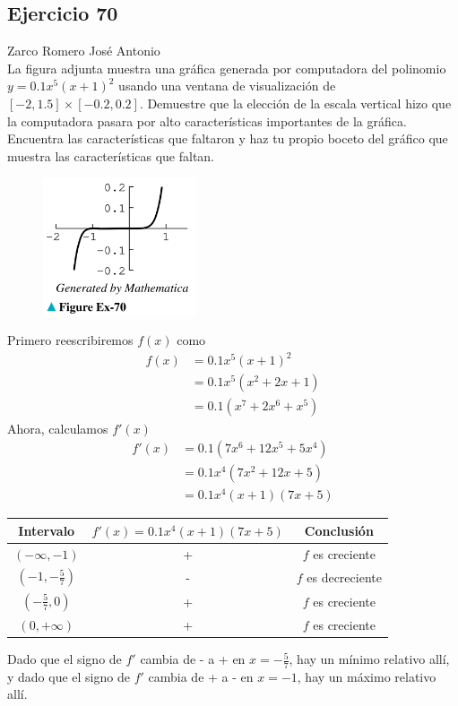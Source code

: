\documentclass[12pt]{article}
\begin{document}
 \subsection{Ejercicio 70} Zarco Romero José Antonio \\

 La figura adjunta muestra una gráfica generada por computadora del polinomio $y = 0.1x^5 (x + 1)^2$ usando una ventana de visualización de $[−2, 1.5] \times [−0.2, 0.2]$. Demuestre que la elección de la escala vertical hizo que la computadora pasara por alto características importantes de la gráfica. Encuentra las características que faltaron y haz tu propio boceto del gráfico que muestra las características que faltan.
 \begin{figure}[H]
 \centering
 \includegraphics[width=0.4\textwidth]{../img/img_Lista3/2_70.png}
 \end{figure}
 Primero reescribiremos $f(x)$ como
 \begin{align*}
   f(x)
   &=0.1x^5 (x + 1)^2 \\
   &= 0.1x^5(x^2+2x+1)\\
   &= 0.1(x^7+2x^6+x^5)
 \end{align*}
 Ahora, calculamos $f'(x)$
 \begin{align*}
   f'(x)
   &= 0.1(7x^6+12x^5+5x^4)\\
   &= 0.1x^4(7x^2+12x+5)\\
   &=0.1x^4(x+1)(7x+5)
 \end{align*}
 
 \begin{table}[H]
   \centering
   \begin{tabular}{c|c|c}
     \hline
     Intervalo & $f'(x) = 0.1x^4(x+1)(7x+5)$ & Conclusión \\
     \hline
     $(-\infty,-1)$ & + & $f$ es creciente \\
     $(-1,-\frac{5}{7})$ & - & $f$ es decreciente \\
     $(-\frac{5}{7},0)$ & + & $f$ es creciente\\
     $(0,+\infty)$ & + & $f$ es creciente\\
     \hline
   \end{tabular}
 \end{table}
 Dado que el signo de $f'$ cambia de - a + en $x=-\frac{5}{7}$, hay un mínimo relativo allí, y
 dado que el signo de $f'$ cambia de + a - en $x=-1$, hay un máximo relativo allí.
 
\end{document}

